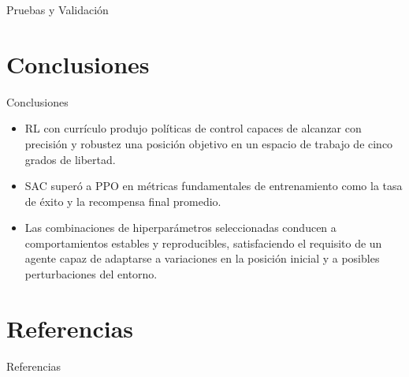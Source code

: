 \documentclass[spanish,10pt]{beamer}
\begin{document}
\begin{frame}{Pruebas y Validación}
\begin{figure}[h!]
		\end{figure}
	\end{frame}
	
	\section{Conclusiones}
	\begin{frame}{Conclusiones}
		\begin{itemize}
			\item RL con currículo produjo políticas de control capaces de alcanzar con precisión y robustez una posición objetivo en un espacio de trabajo de cinco grados de libertad.
			\item SAC superó a PPO en métricas fundamentales de entrenamiento como la tasa de éxito y la recompensa final promedio.
			\item Las combinaciones de hiperparámetros seleccionadas conducen a comportamientos estables y reproducibles, satisfaciendo el requisito de un agente capaz de adaptarse a variaciones en la posición inicial y a posibles perturbaciones del entorno.
		\end{itemize}
	\end{frame}
	
	\section{Referencias}
	\begin{frame}[allowframebreaks]{Referencias}
		\footnotesize
		
		\nocite{*}
		\printbibliography
		
	\end{frame}

	
\end{document}
